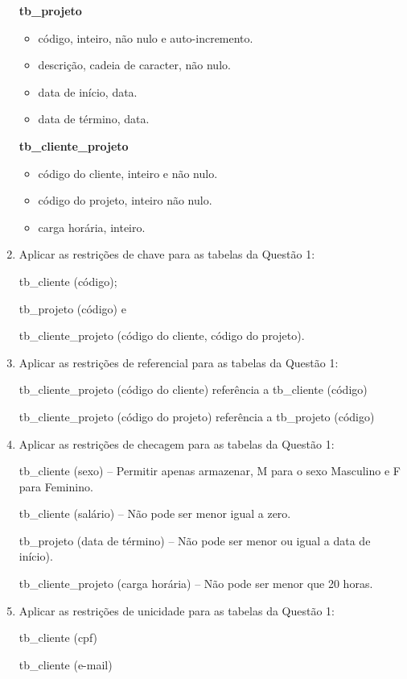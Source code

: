 \documentclass[11pt]{article}
\begin{document}
\begin{enumerate}
	\textbf{tb\_projeto}
	\begin{itemize}
		\item código, inteiro, não nulo e auto-incremento.
		\item descrição, cadeia de caracter, não nulo.
		\item data de início, data.
		\item data de término, data.
	\end{itemize}
	
	\textbf{tb\_cliente\_projeto}
	\begin{itemize}
		\item código do cliente, inteiro e não nulo.
		\item código do projeto, inteiro não nulo.
		\item carga horária, inteiro.
	\end{itemize}

	\item Aplicar as restrições de chave para as tabelas da Questão 1:

	tb\_cliente (código);

	tb\_projeto (código) e

	tb\_cliente\_projeto (código do cliente, código do projeto).
	
	\item Aplicar as restrições de referencial para as tabelas da Questão 1:
	
	tb\_cliente\_projeto (código do cliente) referência a tb\_cliente (código)
	
	tb\_cliente\_projeto (código do projeto) referência a tb\_projeto (código)
	
	\item Aplicar as restrições de checagem para as tabelas da Questão 1:
	
	tb\_cliente (sexo) – Permitir apenas armazenar, M para o sexo Masculino e F para Feminino.
	
	tb\_cliente (salário) – Não pode ser menor igual a zero.
	
	tb\_projeto (data de término) – Não pode ser menor ou igual a data de início).
	
	tb\_cliente\_projeto (carga horária) – Não pode ser menor que 20 horas.
	
	\item Aplicar as restrições de unicidade para as tabelas da Questão 1:
	
	tb\_cliente (cpf)
	
	tb\_cliente (e-mail)
\end{enumerate}
\end{document}
